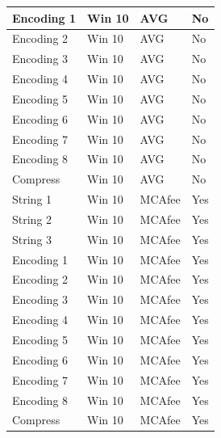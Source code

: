 \documentclass{article}%
\begin{document}
\begin{table}[]
\begin{center}
\begin{tabular}{|l|l|l|l|}
Encoding 1           & Win 10      & AVG              & No                \\ \hline
Encoding 2           & Win 10      & AVG              & No                \\ \hline
Encoding 3           & Win 10      & AVG              & No                \\ \hline
Encoding 4           & Win 10      & AVG              & No                \\ \hline
Encoding 5           & Win 10      & AVG              & No                \\ \hline
Encoding 6           & Win 10      & AVG              & No                \\ \hline
Encoding 7           & Win 10      & AVG              & No                \\ \hline
Encoding 8           & Win 10      & AVG              & No                \\ \hline
Compress             & Win 10      & AVG              & No                \\ \hline
String 1             & Win 10      & MCAfee          & Yes               \\ \hline
String 2             & Win 10      & MCAfee          & Yes               \\ \hline
String 3             & Win 10      & MCAfee          & Yes               \\ \hline
Encoding 1           & Win 10      & MCAfee          & Yes               \\ \hline
Encoding 2           & Win 10      & MCAfee          & Yes               \\ \hline
Encoding 3           & Win 10      & MCAfee          & Yes               \\ \hline
Encoding 4           & Win 10      & MCAfee          & Yes               \\ \hline
Encoding 5           & Win 10      & MCAfee          & Yes               \\ \hline
Encoding 6           & Win 10      & MCAfee          & Yes               \\ \hline
Encoding 7           & Win 10      & MCAfee          & Yes               \\ \hline
Encoding 8           & Win 10      & MCAfee          & Yes               \\ \hline
Compress             & Win 10      & MCAfee          & Yes               \\ \hline
\end{tabular}
\end{center}
\end{table}
\end{document}
